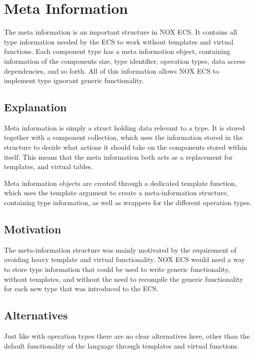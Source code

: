\section{Meta Information}
\label{subsec:detailed_meta_information}
The meta information is an important structure in NOX ECS.
It contains all type information needed by the ECS to work without templates and virtual functions.
Each component type has a meta information object, containing information of the components size, type identifier, operation types, data access dependencies, and so forth.
All of this information allows NOX ECS to implement type ignorant generic functionality.

\subsection{Explanation}
Meta information is simply a struct holding data relevant to a type.
It is stored together with a component collection, which uses the information stored in the structure to decide what actions it should take on the components stored within itself.
This means that the meta information both acts as a replacement for templates, and virtual tables.

Meta information objects are created through a dedicated template function, which uses the template argument to create a meta-information structure, containing type information, as well as wrappers for the different operation types.

\subsection{Motivation}
The meta-information structure was mainly motivated by the requirement of avoiding heavy template and virtual functionality.
NOX ECS would need a way to store type information that could be used to write generic functionality, without templates, and without the need to recompile the generic functionality for each new type that was introduced to the ECS.

\subsection{Alternatives}
Just like with operation types there are no clear alternatives here, other than
the default functionality of the language through templates and virtual functions.

